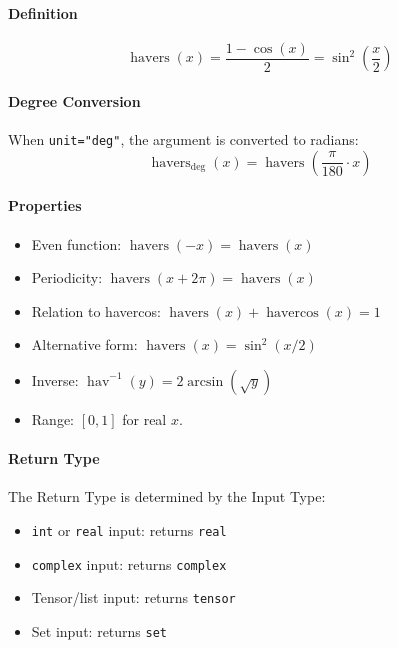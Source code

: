 \paragraph{Definition}
\[
\operatorname{havers}(x) = \frac{1 - \cos(x)}{2} = \sin^2\left(\frac{x}{2}\right)
\]

\paragraph{Degree Conversion}
When \texttt{unit="deg"}, the argument is converted to radians:
\[
\operatorname{havers}_{\text{deg}}(x) = \operatorname{havers}\left(\frac{\pi}{180} \cdot x\right)
\]

\paragraph{Properties}
\begin{itemize}
\item Even function: $\operatorname{havers}(-x) = \operatorname{havers}(x)$
\item Periodicity: $\operatorname{havers}(x + 2\pi) = \operatorname{havers}(x)$
\item Relation to havercos: $\operatorname{havers}(x) + \operatorname{havercos}(x) = 1$
\item Alternative form: $\operatorname{havers}(x) = \sin^2(x/2)$
\item Inverse: $\operatorname{hav}^{-1}(y) = 2\arcsin(\sqrt{y})$
\item Range: $[0, 1]$ for real $x$.
\end{itemize}

\paragraph{Return Type}
The Return Type is determined by the Input Type:
\begin{itemize}
\item \texttt{int} or \texttt{real} input: returns \texttt{real}
\item \texttt{complex} input: returns \texttt{complex}
\item Tensor/list input: returns \texttt{tensor}
\item Set input: returns \texttt{set}
\end{itemize}

